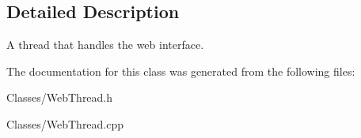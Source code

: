 \subsection{Detailed Description}
A thread that handles the web interface. 

The documentation for this class was generated from the following files\+:\begin{DoxyCompactItemize}
\item 
Classes/Web\+Thread.\+h\item 
Classes/Web\+Thread.\+cpp\end{DoxyCompactItemize}
